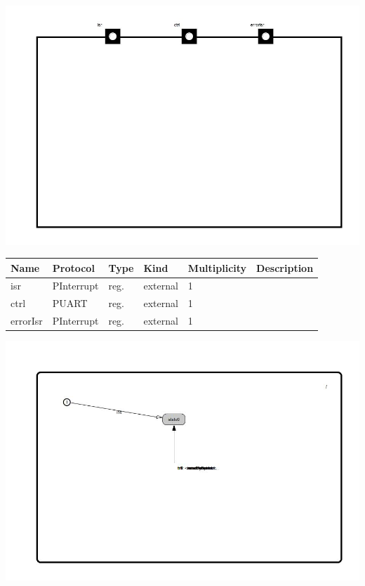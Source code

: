 
{
\centering{}
\includegraphics[width=1.0\textwidth]{./images/AUart7_structure.jpg}
}

\begin{tabular}[ht]{|l|l|l|l|l|p{5cm}|}
\hline
\textbf{Name} & \textbf{Protocol} & \textbf{Type} & \textbf{Kind} & \textbf{Multiplicity} & \textbf{Description}\\
\hline
isr & PInterrupt & reg. & external & 1 & \\
\hline
ctrl & PUART & reg. & external & 1 & \\
\hline
errorIsr & PInterrupt & reg. & external & 1 & \\
\hline
\end{tabular}

{
\centering{}
\includegraphics[width=1.0\textwidth]{./images/AUart7_behavior.jpg}
}

\begin{par}

\end{par}



